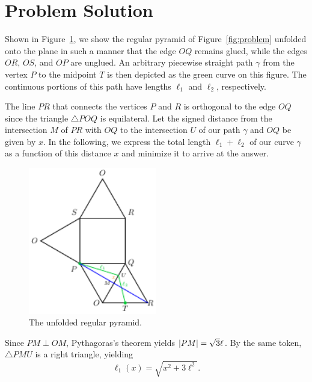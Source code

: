 \section{Problem Solution}
\label{sec:solution}

Shown in Figure~\ref{fig:unfolded}, we show the regular pyramid of
Figure~\ref{fig:problem} unfolded onto the plane in such a manner that the edge
$OQ$ remains glued, while the edges $OR$, $OS$, and $OP$ are unglued. An
arbitrary piecewise straight path $\gamma$ from the vertex $P$ to the midpoint
$T$ is then depicted as the green curve on this figure. The continuous portions
of this path have lengths $\ell_1$ and $\ell_2$, respectively.

The line $PR$ that connects the vertices $P$ and $R$ is orthogonal to the edge
$OQ$ since the triangle $\triangle POQ$ is equilateral. Let the signed distance
from the intersection $M$ of $PR$ with $OQ$ to the intersection $U$ of our path
$\gamma$ and $OQ$ be given by $x$. In the following, we express the total length
$\ell_1 + \ell_2$ of our curve $\gamma$ as a function of this distance $x$ and
minimize it to arrive at the answer.

\begin{figure}[h]
  \centering
  \includegraphics[trim={0 0 0
  0cm},clip,width=0.5\textwidth]{./figures/pyramid-unfolded.pdf}
  \vspace{-8mm}
  \caption{The unfolded regular pyramid.}
  \label{fig:unfolded}
\end{figure}

Since $PM \perp OM$, Pythagoras's theorem yields $\left|{PM}\right| = \sqrt{3}\ell$. By
the same token, $\triangle PMU$ is a right triangle, yielding \[ \ell_1(x) =
\sqrt{x^2 + 3\ell^2}. \]
